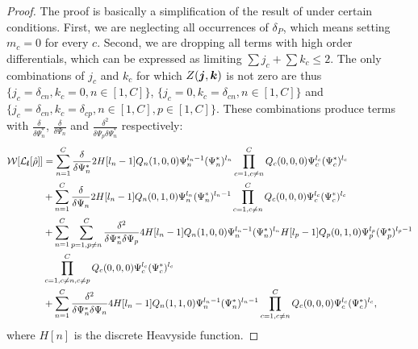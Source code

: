 \begin{proof}
The proof is basically a simplification of the result of  under certain conditions.
First, we are neglecting all occurrences of $\delta_P$, which means setting $m_c = 0$ for every $c$.
Second, we are dropping all terms with high order differentials,
which can be expressed as limiting $\sum j_c + \sum k_c \le 2$.
The only combinations of $j_c$ and $k_c$ for which $Z(\boldsymbol{j}, \boldsymbol{k})$ is not zero are thus
$\{ j_c = \delta_{cn}, k_c = 0, n \in [1, C] \}$,
$\{ j_c = 0, k_c = \delta_{cn}, n \in [1, C] \}$ and
$\{ j_c = \delta_{cn}, k_c = \delta_{cp}, n \in [1, C], p \in [1, C] \}$.
These combinations produce terms with $\frac{\delta}{\delta \Psi_n^*}$,
$\frac{\delta}{\delta \Psi_n}$ and
$\frac{\delta^2}{\delta \Psi_p \delta \Psi_n^*}$ respectively:
\begin{equation*}
\begin{split}
	\mathcal{W}[\mathcal{L}_{\boldsymbol{l}}[\hat{\rho}]]
	& = \sum_{n=1}^C \frac{\delta}{\delta \Psi_n^*}
		2 H[l_n - 1] Q_n(1, 0, 0) \Psi_n^{l_n - 1} (\Psi_n^*)^{l_n}
		\prod_{c=1, c \ne n}^C Q_c(0, 0, 0) \Psi_c^{l_c} (\Psi_c^*)^{l_c} \\
	& + \sum_{n=1}^C \frac{\delta}{\delta \Psi_n}
		2 H[l_n - 1] Q_n(0, 1, 0) \Psi_n^{l_n} (\Psi_n^*)^{l_n - 1}
		\prod_{c=1, c \ne n}^C Q_c(0, 0, 0) \Psi_c^{l_c} (\Psi_c^*)^{l_c} \\
	& + \sum_{n=1}^C \sum_{p=1, p \ne n}^C \frac{\delta^2}{\delta \Psi_n^* \delta \Psi_p}
		4 H[l_n - 1] Q_n(1, 0, 0) \Psi_n^{l_n - 1} (\Psi_n^*)^{l_n}
		H[l_p - 1] Q_p(0, 1, 0) \Psi_p^{l_p} (\Psi_p^*)^{l_p - 1} \\
	&	\prod_{c=1, c \ne n, c \ne p}^C Q_c(0, 0, 0) \Psi_c^{l_c} (\Psi_c^*)^{l_c} \\
	& + \sum_{n=1}^C \frac{\delta^2}{\delta \Psi_n^* \delta \Psi_n}
		4 H[l_n - 1] Q_n(1, 1, 0) \Psi_n^{l_n - 1} (\Psi_n^*)^{l_n - 1}
		\prod_{c=1, c \ne n}^C Q_c(0, 0, 0) \Psi_c^{l_c} (\Psi_c^*)^{l_c},
\end{split}
\end{equation*}
where $H[n]$ is the discrete Heavyside function.


\end{proof}
